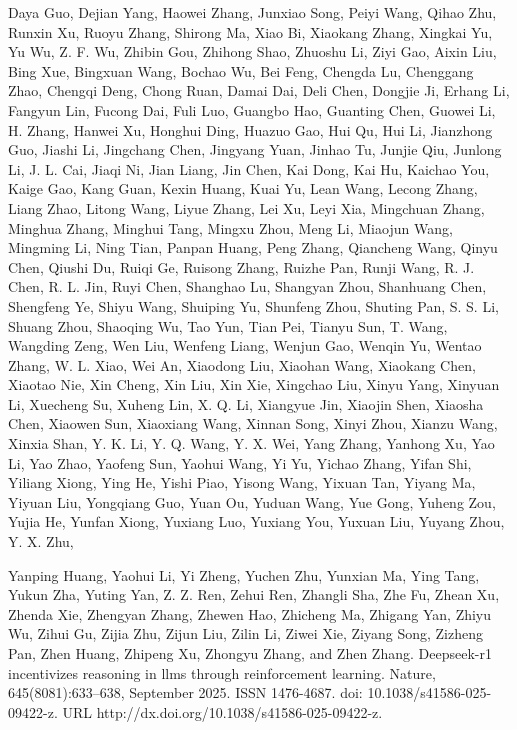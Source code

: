 Daya Guo, Dejian Yang, Haowei Zhang, Junxiao Song, Peiyi Wang, Qihao
Zhu, Runxin Xu, Ruoyu Zhang, Shirong Ma, Xiao Bi, Xiaokang Zhang,
Xingkai Yu, Yu Wu, Z. F. Wu, Zhibin Gou, Zhihong Shao, Zhuoshu Li, Ziyi
Gao, Aixin Liu, Bing Xue, Bingxuan Wang, Bochao Wu, Bei Feng, Chengda
Lu, Chenggang Zhao, Chengqi Deng, Chong Ruan, Damai Dai, Deli Chen,
Dongjie Ji, Erhang Li, Fangyun Lin, Fucong Dai, Fuli Luo, Guangbo Hao,
Guanting Chen, Guowei Li, H. Zhang, Hanwei Xu, Honghui Ding, Huazuo Gao,
Hui Qu, Hui Li, Jianzhong Guo, Jiashi Li, Jingchang Chen, Jingyang Yuan,
Jinhao Tu, Junjie Qiu, Junlong Li, J. L. Cai, Jiaqi Ni, Jian Liang, Jin
Chen, Kai Dong, Kai Hu, Kaichao You, Kaige Gao, Kang Guan, Kexin Huang,
Kuai Yu, Lean Wang, Lecong Zhang, Liang Zhao, Litong Wang, Liyue Zhang,
Lei Xu, Leyi Xia, Mingchuan Zhang, Minghua Zhang, Minghui Tang, Mingxu
Zhou, Meng Li, Miaojun Wang, Mingming Li, Ning Tian, Panpan Huang, Peng
Zhang, Qiancheng Wang, Qinyu Chen, Qiushi Du, Ruiqi Ge, Ruisong Zhang,
Ruizhe Pan, Runji Wang, R. J. Chen, R. L. Jin, Ruyi Chen, Shanghao Lu,
Shangyan Zhou, Shanhuang Chen, Shengfeng Ye, Shiyu Wang, Shuiping Yu,
Shunfeng Zhou, Shuting Pan, S. S. Li, Shuang Zhou, Shaoqing Wu, Tao Yun,
Tian Pei, Tianyu Sun, T. Wang, Wangding Zeng, Wen Liu, Wenfeng Liang,
Wenjun Gao, Wenqin Yu, Wentao Zhang, W. L. Xiao, Wei An, Xiaodong Liu,
Xiaohan Wang, Xiaokang Chen, Xiaotao Nie, Xin Cheng, Xin Liu, Xin Xie,
Xingchao Liu, Xinyu Yang, Xinyuan Li, Xuecheng Su, Xuheng Lin, X. Q. Li,
Xiangyue Jin, Xiaojin Shen, Xiaosha Chen, Xiaowen Sun, Xiaoxiang Wang,
Xinnan Song, Xinyi Zhou, Xianzu Wang, Xinxia Shan, Y. K. Li, Y. Q. Wang,
Y. X. Wei, Yang Zhang, Yanhong Xu, Yao Li, Yao Zhao, Yaofeng Sun, Yaohui
Wang, Yi Yu, Yichao Zhang, Yifan Shi, Yiliang Xiong, Ying He, Yishi
Piao, Yisong Wang, Yixuan Tan, Yiyang Ma, Yiyuan Liu, Yongqiang Guo,
Yuan Ou, Yuduan Wang, Yue Gong, Yuheng Zou, Yujia He, Yunfan Xiong,
Yuxiang Luo, Yuxiang You, Yuxuan Liu, Yuyang Zhou, Y. X. Zhu,



Yanping Huang, Yaohui Li, Yi Zheng, Yuchen Zhu, Yunxian Ma, Ying Tang,
Yukun Zha, Yuting Yan, Z. Z. Ren, Zehui Ren, Zhangli Sha, Zhe Fu, Zhean
Xu, Zhenda Xie, Zhengyan Zhang, Zhewen Hao, Zhicheng Ma, Zhigang Yan,
Zhiyu Wu, Zihui Gu, Zijia Zhu, Zijun Liu, Zilin Li, Ziwei Xie, Ziyang
Song, Zizheng Pan, Zhen Huang, Zhipeng Xu, Zhongyu Zhang, and Zhen
Zhang. Deepseek-r1 incentivizes reasoning in llms through reinforcement
learning. Nature, 645(8081):633--638, September 2025. ISSN 1476-4687.
doi: 10.1038/s41586-025-09422-z. URL
http://dx.doi.org/10.1038/s41586-025-09422-z.

